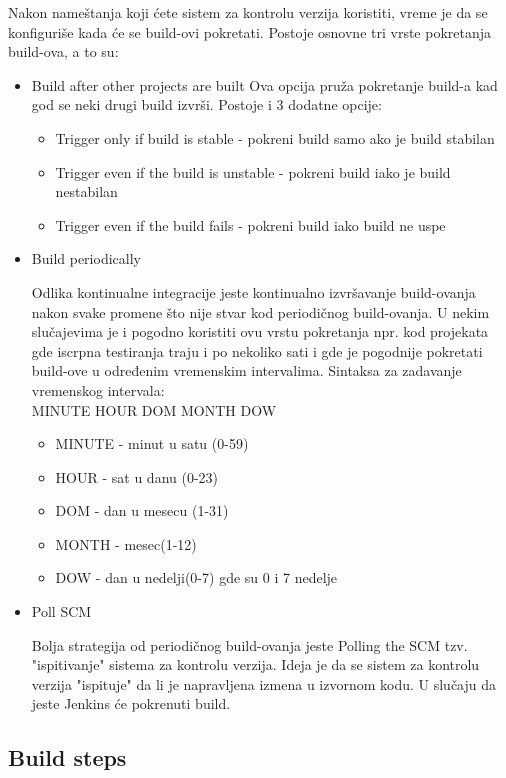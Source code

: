 Nakon nameštanja koji ćete sistem za kontrolu verzija koristiti, vreme je da se konfiguriše kada će se build-ovi pokretati. Postoje osnovne tri vrste pokretanja build-ova, a to su:

\begin{itemize}
  
\item Build after other projects are built
Ova opcija pruža pokretanje build-a kad god se neki drugi build izvrši. Postoje i 3 dodatne opcije:
\begin{itemize}  
\item Trigger only if build is stable - pokreni build samo ako je build stabilan
\item Trigger even if the build is unstable - pokreni build iako je build nestabilan
\item Trigger even if the build fails - pokreni build iako build ne uspe
\end{itemize}

\item Build periodically

Odlika kontinualne integracije jeste kontinualno izvršavanje build-ovanja nakon svake promene što nije stvar kod periodičnog build-ovanja. U nekim slučajevima je i pogodno koristiti ovu vrstu pokretanja npr. kod projekata gde iscrpna testiranja traju i po nekoliko sati i gde je pogodnije pokretati build-ove u određenim vremenskim intervalima.
Sintaksa za zadavanje vremenskog intervala: \\
MINUTE HOUR DOM MONTH DOW
\begin{itemize}
\item MINUTE - minut u satu (0-59)
\item HOUR - sat u danu (0-23)
\item DOM - dan u mesecu (1-31)
\item MONTH - mesec(1-12)
\item DOW - dan u nedelji(0-7) gde su 0 i 7 nedelje
\end{itemize}

\item Poll SCM

Bolja strategija od periodičnog build-ovanja jeste Polling the SCM tzv. "ispitivanje" sistema za kontrolu verzija. Ideja je da se sistem za kontrolu verzija "ispituje" da li je napravljena izmena u izvornom kodu. U slučaju da jeste Jenkins će pokrenuti build.
\end{itemize}

\subsection{Build steps}

